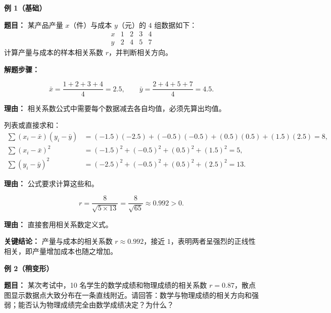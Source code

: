 \begin{examplebox}
	\textbf{\textcolor{CExample}{例 1（基础）}}

	\textbf{\textcolor{CExample}{题目：}}
	某产品产量 $x$（件）与成本 $y$（元）的 $4$ 组数据如下：
	\[
		\begin{array}{c|cccc}
			x & 1 & 2 & 3 & 4 \\ \hline
			y & 2 & 4 & 5 & 7
		\end{array}
	\]
	计算产量与成本的样本相关系数 $r$，并判断相关方向。

	\textbf{\textcolor{CExample}{解题步骤：}}
	\begin{description}[style=nextline, leftmargin=2.8em, labelsep=0.5em, itemsep=0.45em]
		\item[\textbf{第一步（计算样本均值）：}]
			\[
				\bar{x}=\frac{1+2+3+4}{4}=2.5,
				\qquad
				\bar{y}=\frac{2+4+5+7}{4}=4.5.
			\]
			\par\textbf{理由：} 相关系数公式中需要每个数据减去各自均值，必须先算出均值。

		\item[\textbf{第二步（计算偏差乘积与平方和）：}] 列表或直接求和：
			\[
				\begin{aligned}
					\sum (x_i-\bar{x})(y_i-\bar{y})
					&= (-1.5)(-2.5)+(-0.5)(-0.5)+(0.5)(0.5)+(1.5)(2.5)=8,\\
					\sum (x_i-\bar{x})^2 &= (-1.5)^2+(-0.5)^2+(0.5)^2+(1.5)^2=5,\\
					\sum (y_i-\bar{y})^2 &= (-2.5)^2+(-0.5)^2+(0.5)^2+(2.5)^2=13.
			\end{aligned}
			\]
			\par\textbf{理由：} 公式要求计算这些和。

		\item[\textbf{第三步（代入公式得 $r$）：}]
			\[
				r = \frac{8}{\sqrt{5\times13}}=\frac{8}{\sqrt{65}}\approx0.992>0.
			\]
			\par\textbf{理由：} 直接套用相关系数定义式。
	\end{description}

	\textbf{\textcolor{CExample}{关键结论：}}
	产量与成本的相关系数 $r\approx0.992$，接近 $1$，表明两者呈强烈的正线性相关，即产量增加成本也随之增加。

	\medskip
	\textbf{\textcolor{CExample}{例 2（稍变形）}}

	\textbf{\textcolor{CExample}{题目：}}
	某次考试中，10 名学生的数学成绩和物理成绩的相关系数 $r=0.87$，散点图显示数据点大致分布在一条直线附近。请回答：数学与物理成绩的相关方向和强弱；能否认为物理成绩完全由数学成绩决定？为什么？


\end{examplebox}
